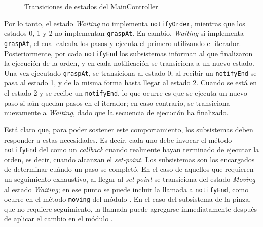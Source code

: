 \begin{figure}[H]
\caption{Transiciones de estados del MainController}
\label{statesMainController}
\begin{center}
\end{center}
\end{figure}

Por lo tanto, el estado \textit{Waiting} no implementa \verb|notifyOrder|, mientras que los estados 0, 1 y 2 no implementan \verb|graspAt|. En cambio, \textit{Waiting} sí implementa \verb|graspAt|, el cual calcula los pasos y ejecuta el primero utilizando el iterador. Posteriormente, por cada \verb|notifyEnd| los subsistemas informan al \MainController que finalizaron la ejecución de la orden, y en cada notificación se transiciona a un nuevo estado. Una vez ejecutado \verb|graspAt|, se transiciona al estado 0; al recibir un \verb|notifyEnd| se pasa al estado 1, y de la misma forma hasta llegar al estado 2. Cuando se está en el estado 2 y se recibe un \verb|notifyEnd|, lo que ocurre es que se ejecuta un nuevo paso si aún quedan pasos en el iterador; en caso contrario, se transiciona nuevamente a \textit{Waiting}, dado que la secuencia de ejecución ha finalizado.

Está claro que, para poder sostener este comportamiento, los subsistemas deben responder a estas necesidades. Es decir, cada uno debe invocar el método \verb|notifyEnd| del \MainController como un \textit{callback} cuando realmente hayan terminado de ejecutar la orden, es decir, cuando alcanzan el \textit{set-point}. Los subsistemas son los encargados de determinar cuándo un paso se completó. En el caso de aquellos que requieren un seguimiento exhaustivo, al llegar al \textit{set-point} se transiciona del estado \textit{Moving} al estado \textit{Waiting}; en ese punto se puede incluir la llamada a \verb|notifyEnd|, como ocurre en el método \verb|moving| del módulo \Moving. En el caso del subsistema de la pinza, que no requiere seguimiento, la llamada puede agregarse inmediatamente después de aplicar el cambio en el módulo \Pinza.

